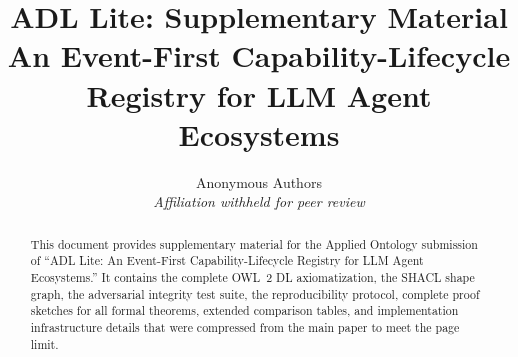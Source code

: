 \documentclass[11pt,a4paper]{article}
\title{ADL Lite: Supplementary Material\\An Event-First Capability-Lifecycle Registry for LLM Agent Ecosystems}
\author{
    Anonymous Authors \\
    \textit{Affiliation withheld for peer review}
}
\date{}
\theoremstyle{definition}
\theoremstyle{remark}
\begin{document}
\maketitle

\begin{abstract}
This document provides supplementary material for the Applied Ontology submission of ``ADL Lite: An Event-First Capability-Lifecycle Registry for LLM Agent Ecosystems.'' It contains the complete OWL~2 DL axiomatization, the SHACL shape graph, the adversarial integrity test suite, the reproducibility protocol, complete proof sketches for all formal theorems, extended comparison tables, and implementation infrastructure details that were compressed from the main paper to meet the page limit.
\end{abstract}

\appendix






























\end{document}
